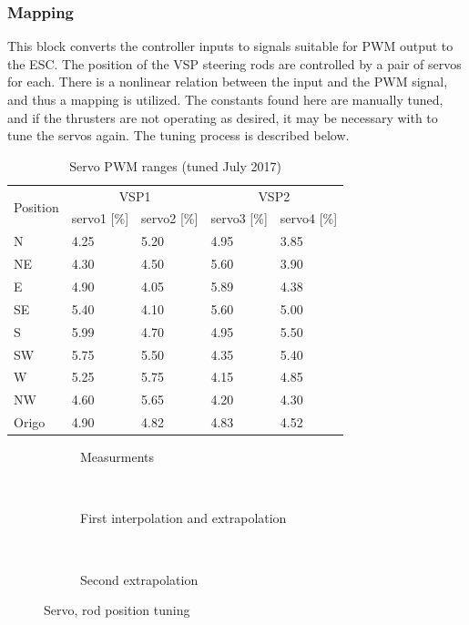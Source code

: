 \subsubsection{Mapping}
This block converts the controller inputs to signals suitable for PWM output to the ESC. The position of the VSP steering rods are controlled by a pair of servos for each. There is a nonlinear relation between the input and the PWM signal, and thus a mapping is utilized. The constants found here are manually tuned, and if the thrusters are not operating as desired, it may be necessary with to tune the servos again. The tuning process is described below. 

\begin{table}[h!]
	\caption{Servo PWM ranges (tuned July 2017)}
	\centering
	\begin{tabular}{lllll}
		\toprule 
		\multirow{2}{*}{Position} & \multicolumn{2}{c}{VSP1} & \multicolumn{2}{c}{VSP2}\tabularnewline
		\cmidrule{2-5} 
		& servo1 {[}\%{]} & servo2 {[}\%{]} & servo3 {[}\%{]} & servo4 {[}\%{]}\tabularnewline
		\midrule
		N & 4.25 & 5.20 & 4.95 & 3.85\tabularnewline
		NE & 4.30 & 4.50 & 5.60 & 3.90\tabularnewline
		E & 4.90 & 4.05 & 5.89 & 4.38\tabularnewline
		SE & 5.40 & 4.10 & 5.60 & 5.00\tabularnewline
		S & 5.99 & 4.70 & 4.95 & 5.50\tabularnewline
		SW & 5.75 & 5.50 & 4.35 & 5.40\tabularnewline
		W & 5.25 & 5.75 & 4.15 & 4.85\tabularnewline
		NW & 4.60 & 5.65 & 4.20 & 4.30\tabularnewline
		\midrule
		Origo & 4.90 & 4.82 & 4.83 & 4.52\tabularnewline
	\end{tabular}
	\label{tab: CSE1 servo ranges} 
\end{table}

\begin{figure}[htb!]
	\centering
	
	\begin{subfigure}{.3\textwidth}
		\centering{}\caption{Measurments}\label{fig: Servo measurements}\end{subfigure}
	~
	\begin{subfigure}{.3\textwidth}
		\centering{}\caption{First interpolation and extrapolation}\label{fig: Servo first extrapolation}\end{subfigure}
	~
	\begin{subfigure}{.3\textwidth}
		\centering{}\caption{Second extrapolation}\label{fig: Servo second extrapolation}\end{subfigure}
	
	\caption{Servo, rod position tuning}
\end{figure}

